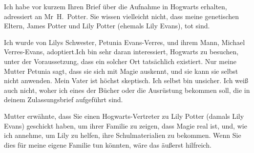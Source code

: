 \begin{writtenNote}


Ich habe vor kurzem Ihren Brief über die Aufnahme in Hogwarts erhalten, adressiert an Mr~H.~Potter. Sie wissen vielleicht nicht, dass meine genetischen Eltern, James Potter und Lily Potter (ehemals Lily Evans), tot sind.

Ich wurde von Lilys Schwester, Petunia Evans-Verres, und ihrem Mann, Michael Verres-Evans, adoptiert.Ich bin sehr daran interessiert, Hogwarts zu besuchen, unter der Voraussetzung, dass ein solcher Ort tatsächlich existiert. Nur meine Mutter Petunia sagt, dass sie sich mit Magie auskennt, und sie kann sie selbst nicht anwenden. Mein Vater ist höchst skeptisch. Ich selbst bin unsicher. Ich weiß auch nicht, woher ich eines der Bücher oder die Ausrüstung bekommen soll, die in deinem Zulassungsbrief aufgeführt sind.

Mutter erwähnte, dass Sie einen Hogwarts-Vertreter zu Lily Potter (damals Lily Evans) geschickt haben, um ihrer Familie zu zeigen, dass Magie real ist, und, wie ich annehme, um Lily zu helfen, ihre Schulmaterialien zu bekommen. Wenn Sie dies für meine eigene Familie tun könnten, wäre das äußerst hilfreich.

\end{writtenNote}


